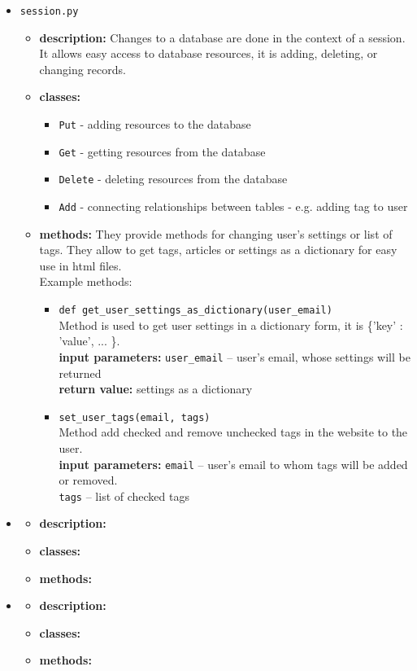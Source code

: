 \documentclass[12pt]{article}
\begin{document}
\begin{itemize}
	\item \texttt{session.py}
	\begin{itemize}
		\item \textbf{description:} Changes to a database are done in the context of a session. It allows easy access to database resources, it is adding, deleting, or changing records.
		\item \textbf{classes:} 
			\begin{itemize}
				\item \texttt{Put} - adding resources to the database
				\item \texttt{Get} - getting resources from the database 
				\item \texttt{Delete} - deleting resources from the database
				\item \texttt{Add} - connecting relationships between tables - e.g. adding tag to user
			\end{itemize}
		\item \textbf{methods:} They provide methods for changing user's settings or list of tags. They allow to get tags, articles or settings as a dictionary for easy use in html files. \\
		Example methods:
		\begin{itemize}
			\item \texttt{def get\_user\_settings\_as\_dictionary(user\_email)} \\
			Method is used to get user settings in a dictionary form, it is \{'key' : 'value', ... \}. \\
			\textbf{input parameters:} \texttt{user\_email} -- user's email, whose settings will be returned \\
			\textbf{return value:} settings as a dictionary
			
			\item \texttt{set\_user\_tags(email, tags)} \\
			Method add checked and remove unchecked tags in the website to the user. \\
			\textbf{input parameters:} \texttt{email} -- user's email to whom tags will be added or removed. \\
									   \texttt{tags} -- list of checked tags
			
		\end{itemize}
	\end{itemize}
			
	\item \texttt{}
	\begin{itemize}
		\item \textbf{description:}
		\item \textbf{classes:} 
		\item \textbf{methods:}
	\end{itemize}

	\item \texttt{}
	\begin{itemize}
		\item \textbf{description:}
		\item \textbf{classes:} 
		\item \textbf{methods:}
	\end{itemize}
\end{itemize}
\end{document}
